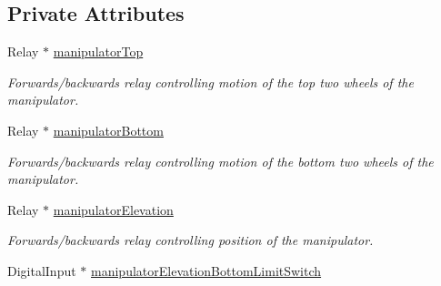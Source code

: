 \subsection*{Private Attributes}
\begin{DoxyCompactItemize}
\item 
\hypertarget{class_r_j_f_r_c2011_1_1_manipulator_a1bb5fb2c9c0dbc0964134726cf9b6a1d}{
Relay $\ast$ \hyperlink{class_r_j_f_r_c2011_1_1_manipulator_a1bb5fb2c9c0dbc0964134726cf9b6a1d}{manipulatorTop}}
\label{class_r_j_f_r_c2011_1_1_manipulator_a1bb5fb2c9c0dbc0964134726cf9b6a1d}

\begin{DoxyCompactList}\small\item\em Forwards/backwards relay controlling motion of the top two wheels of the manipulator. \item\end{DoxyCompactList}\item 
\hypertarget{class_r_j_f_r_c2011_1_1_manipulator_a15dbc0986585acad7d9c32c3e88298d6}{
Relay $\ast$ \hyperlink{class_r_j_f_r_c2011_1_1_manipulator_a15dbc0986585acad7d9c32c3e88298d6}{manipulatorBottom}}
\label{class_r_j_f_r_c2011_1_1_manipulator_a15dbc0986585acad7d9c32c3e88298d6}

\begin{DoxyCompactList}\small\item\em Forwards/backwards relay controlling motion of the bottom two wheels of the manipulator. \item\end{DoxyCompactList}\item 
\hypertarget{class_r_j_f_r_c2011_1_1_manipulator_ab2cff9a8829393c2eb5b69563b6f7fe6}{
Relay $\ast$ \hyperlink{class_r_j_f_r_c2011_1_1_manipulator_ab2cff9a8829393c2eb5b69563b6f7fe6}{manipulatorElevation}}
\label{class_r_j_f_r_c2011_1_1_manipulator_ab2cff9a8829393c2eb5b69563b6f7fe6}

\begin{DoxyCompactList}\small\item\em Forwards/backwards relay controlling position of the manipulator. \item\end{DoxyCompactList}\item 
\hypertarget{class_r_j_f_r_c2011_1_1_manipulator_a451901f7adf2e95371f10a7c8b6c7e3f}{
DigitalInput $\ast$ \hyperlink{class_r_j_f_r_c2011_1_1_manipulator_a451901f7adf2e95371f10a7c8b6c7e3f}{manipulatorElevationBottomLimitSwitch}}
\label{class_r_j_f_r_c2011_1_1_manipulator_a451901f7adf2e95371f10a7c8b6c7e3f}


\end{DoxyCompactItemize}
